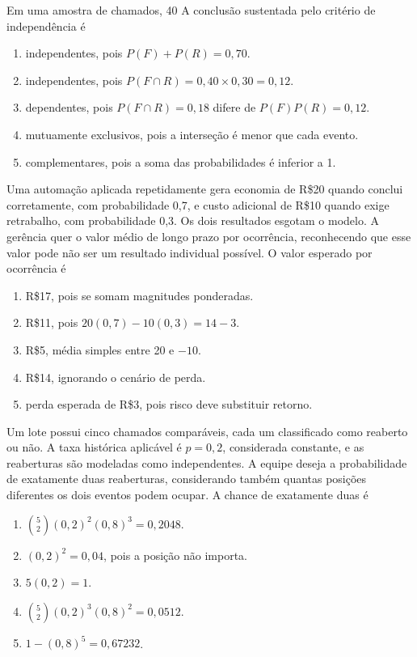\TextoBase Em uma amostra de chamados, 40%
\FonteDidatica
\Comando A conclusão sustentada pelo critério de independência é
\begin{enumerate}[label=\Alph*)]
\item independentes, pois $P(F)+P(R)=0{,}70$.
\item independentes, pois $P(F\cap R)=0{,}40\times0{,}30=0{,}12$.
\item dependentes, pois $P(F\cap R)=0{,}18$ difere de $P(F)P(R)=0{,}12$.
\item mutuamente exclusivos, pois a interseção é menor que cada evento.
\item complementares, pois a soma das probabilidades é inferior a 1.
\end{enumerate}
\TextoBase Uma automação aplicada repetidamente gera economia de R\$20 quando conclui corretamente, com probabilidade 0,7, e custo adicional de R\$10 quando exige retrabalho, com probabilidade 0,3. Os dois resultados esgotam o modelo. A gerência quer o valor médio de longo prazo por ocorrência, reconhecendo que esse valor pode não ser um resultado individual possível.
\FonteDidatica
\Comando O valor esperado por ocorrência é
\begin{enumerate}[label=\Alph*)]\item R\$17, pois se somam magnitudes ponderadas.\item R\$11, pois $20(0{,}7)-10(0{,}3)=14-3$.\item R\$5, média simples entre 20 e $-10$.\item R\$14, ignorando o cenário de perda.\item perda esperada de R\$3, pois risco deve substituir retorno.\end{enumerate}

\TextoBase Um lote possui cinco chamados comparáveis, cada um classificado como reaberto ou não. A taxa histórica aplicável é $p=0{,}2$, considerada constante, e as reaberturas são modeladas como independentes. A equipe deseja a probabilidade de exatamente duas reaberturas, considerando também quantas posições diferentes os dois eventos podem ocupar.
\FonteDidatica
\Comando A chance de exatamente duas é
\begin{enumerate}[label=\Alph*)]\item $\binom52(0{,}2)^2(0{,}8)^3=0{,}2048$.\item $(0{,}2)^2=0{,}04$, pois a posição não importa.\item $5(0{,}2)=1$.\item $\binom52(0{,}2)^3(0{,}8)^2=0{,}0512$.\item $1-(0{,}8)^5=0{,}67232$.\end{enumerate}

